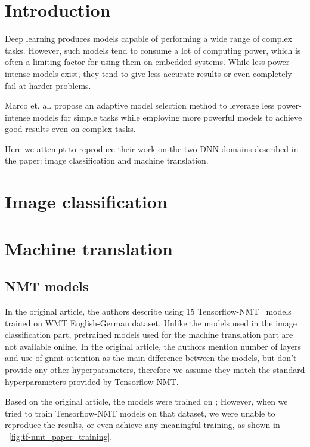 \section{Introduction}

Deep learning produces models capable of performing a wide range of complex tasks. However, such models tend to consume a lot of computing power, which is often a limiting factor for using them on embedded systems. While less power-intense models exist, they tend to give less accurate results or even completely fail at harder problems.

Marco et. al. \cite{marco2019optimizing} propose an adaptive model selection method to leverage less power-intense models for simple tasks while employing more powerful models to achieve good results even on complex tasks.

Here we attempt to reproduce their work on the two DNN domains described in the paper: image classification and machine translation.

\section{Image classification}

\section{Machine translation}

\subsection{NMT models} %

In the original article, the authors describe using 15 Tensorflow-NMT~\cite{luong17} models trained on WMT English-German dataset. Unlike the models used in the image classification part, pretrained models used for the machine translation part are not available online. In the original article, the authors mention number of layers and use of gnmt attention as the main difference between the models, but don't provide any other hyperparameters, therefore we assume they match the standard hyperparameters provided by Tensorflow-NMT.

Based on the original article, the models were trained on ; However, when we tried to train Tensorflow-NMT models on that dataset, we were unable to reproduce the results, or even achieve any meaningful training, as shown in \figurename~\ref{fig:tf-nmt_paper_training}.

